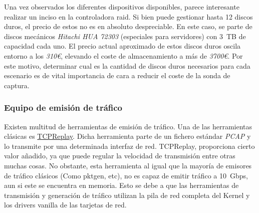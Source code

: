 Una vez observados los diferentes dispositivos disponibles, parece interesante realizar un inciso en la controladora raid.
Si bien puede gestionar hasta 12 discos duros, el precio de estos no es en absoluto despreciable.
En este caso, se parte de discos mecánicos \textit{Hitachi HUA 72303} (especiales para servidores) con 3~TB de capacidad cada uno.
El precio actual aproximado de estos discos duros oscila entorno a los \textit{310€}, elevando el coste de almacenamiento a más de \textit{3700€}.
Por este motivo, determinar cual es la cantidad de discos duros necesarios para cada escenario es de vital importancia de cara a reducir el coste de la sonda de captura.


\subsubsection{Equipo de emisión de tráfico}

Existen multitud de herramientas de emisión de tráfico.
Una de las herramientas clásicas es \href{http://tcpreplay.appneta.com/}{TCPReplay}.
Dicha herramienta parte de un fichero estándar \textit{PCAP} y lo transmite por una determinada interfaz de red. TCPReplay, proporciona cierto valor añadido, ya que puede regular la velocidad de transmisión entre otras muchas cosas. No obstante, esta herramienta al igual que la mayoría de emisores de tráfico clásicos (Como pktgen, etc), no es capaz de emitir tráfico a 10~Gbps, aun si este se encuentra en memoria. Esto se debe a que las herramientas de transmisión y generación de tráfico utilizan la pila de red completa del Kernel y los drivers \gls{vanilla} de las tarjetas de red.

